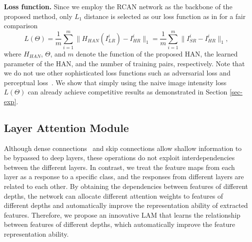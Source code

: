 \documentclass[runningheads]{llncs}
\begin{document}
\textbf{Loss function.} Since we employ the RCAN network as the backbone of the proposed method, only $ L_{1} $ distance is selected as our loss function as in \cite{zhang2018image} for a fair comparison
\begin{equation}
	\mathit{L(\Theta)} = \dfrac{1}{m}\sum_{i=1}^{m}\big\|H_{HAN}(I^{i}_{LR})-I^{i}_{HR}\big\|_{1}= \dfrac{1}{m}\sum_{i=1}^{m}\big\|I^{i}_{SR}-I^{i}_{HR}\big\|_{1} ,
	\end{equation}
where $H_{HAN}$, $ \Theta $, and $m$ denote the function of the proposed HAN, the learned parameter of the HAN, and the number of training pairs, respectively.
	Note that we do not use other sophisticated loss functions such as adversarial loss \cite{NIPS2014_5423} and perceptual loss~\cite{johnson2016perceptual}. We show that simply using the
	naive image intensity loss $L(\Theta)$ can already achieve
	competitive results as demonstrated in Section \ref{sec-exp}.



\subsection{Layer Attention Module}
\label{sec-lam}
Although dense connections~\cite{huang2017densely} and skip connections \cite{he2016deep} allow shallow information to be bypassed to deep layers, 
these operations do not exploit interdependencies between the different layers. 
In contrast, we treat the feature maps from each layer as a response to a specific class, and the responses from different layers are related to each other. 
By obtaining the dependencies between features of different depths, the network can allocate different attention weights to features of different depths and automatically improve the representation ability of extracted features. Therefore, we propose an innovative LAM that learns the relationship between features of different depths, which automatically improve the feature representation ability.
\end{document}
